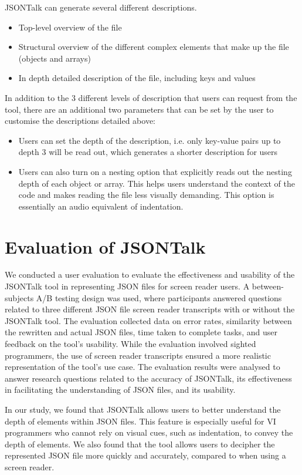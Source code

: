 \documentclass{l4proj}
\begin{document}
JSONTalk can generate several different descriptions. 
\begin{itemize}
    \item Top-level overview of the file
    \item Structural overview of the different complex elements that make up the file (objects and arrays)
    \item In depth detailed description of the file, including keys and values
\end{itemize}

In addition to the 3 different levels of description that users can request from the tool, there are an additional two parameters that can be set by the user to customise the descriptions detailed above:
\begin{itemize}
    \item Users can set the depth of the description, i.e. only key-value pairs up to depth 3 will be read out, which generates a shorter description for users 
    \item Users can also turn on a nesting option that explicitly reads out the nesting depth of each object or array. This helps users understand the context of the code and makes reading the file less visually demanding. This option is essentially an audio equivalent of indentation.
\end{itemize}

\section{Evaluation of JSONTalk}

We conducted a user evaluation to evaluate the effectiveness and usability of the JSONTalk tool in representing JSON files for screen reader users. A between-subjects A/B testing design was used, where participants answered questions related to three different JSON file screen reader transcripts with or without the JSONTalk tool. The evaluation collected data on error rates, similarity between the rewritten and actual JSON files, time taken to complete tasks, and user feedback on the tool's usability. While the evaluation involved sighted programmers, the use of screen reader transcripts ensured a more realistic representation of the tool's use case. The evaluation results were analysed to answer research questions related to the accuracy of JSONTalk, its effectiveness in facilitating the understanding of JSON files, and its usability. 

In our study, we found that JSONTalk allows users to better understand the depth of elements within JSON files. This feature is especially useful for VI programmers who cannot rely on visual cues, such as indentation, to convey the depth of elements. We also found that the tool allows users to decipher the represented JSON file more quickly and accurately, compared to when using a screen reader.
\end{document}
